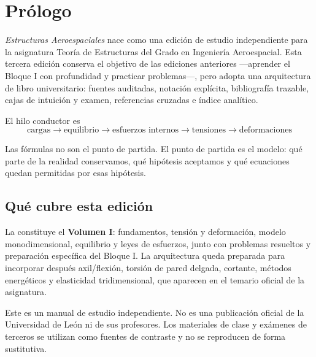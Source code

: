 \chapter*{Prólogo}

\textit{Estructuras Aeroespaciales} nace como una edición de estudio independiente para la asignatura Teoría de Estructuras del Grado en Ingeniería Aeroespacial. Esta tercera edición conserva el objetivo de las ediciones anteriores ---aprender el Bloque I con profundidad y practicar problemas---, pero adopta una arquitectura de libro universitario: fuentes auditadas, notación explícita, bibliografía trazable, cajas de intuición y examen, referencias cruzadas e índice analítico.

El hilo conductor es
\[
\boxed{\text{cargas}\rightarrow\text{equilibrio}\rightarrow\text{esfuerzos internos}\rightarrow\text{tensiones}\rightarrow\text{deformaciones}}
\]

\begin{intuitionbox}
Las fórmulas no son el punto de partida. El punto de partida es el modelo: qué parte de la realidad conservamos, qué hipótesis aceptamos y qué ecuaciones quedan permitidas por esas hipótesis.
\end{intuitionbox}

\section*{Qué cubre esta edición}
La \BookEdition{} constituye el \textbf{Volumen I}: fundamentos, tensión y deformación, modelo monodimensional, equilibrio y leyes de esfuerzos, junto con problemas resueltos y preparación específica del Bloque I. La arquitectura queda preparada para incorporar después axil/flexión, torsión de pared delgada, cortante, métodos energéticos y elasticidad tridimensional, que aparecen en el temario oficial de la asignatura.\autocite{ule-guia-2026}

\begin{warningbox}
Este es un manual de estudio independiente. No es una publicación oficial de la Universidad de León ni de sus profesores. Los materiales de clase y exámenes de terceros se utilizan como fuentes de contraste y no se reproducen de forma sustitutiva.
\end{warningbox}
